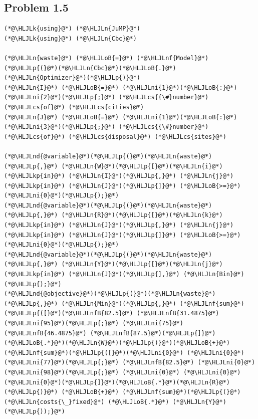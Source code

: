 \documentclass[12pt,a4paper]{article}
\newcommand{\HLJLk}[1]{\textcolor[RGB]{148,91,176}{\textbf{#1}}}
\newcommand{\HLJLkp}[1]{\textcolor[RGB]{148,91,176}{\textbf{#1}}}
\newcommand{\HLJLn}[1]{#1}
\newcommand{\HLJLnd}[1]{\textcolor[RGB]{214,102,97}{#1}}
\newcommand{\HLJLnf}[1]{\textcolor[RGB]{66,102,213}{#1}}
\newcommand{\HLJLnfB}[1]{\textcolor[RGB]{59,151,46}{#1}}
\newcommand{\HLJLni}[1]{\textcolor[RGB]{59,151,46}{#1}}
\newcommand{\HLJLoB}[1]{\textcolor[RGB]{102,102,102}{\textbf{#1}}}
\newcommand{\HLJLp}[1]{#1}
\newcommand{\HLJLcs}[1]{\textcolor[RGB]{153,153,119}{\textit{#1}}}
\begin{document}
\subsection{Problem 1.5}

\begin{lstlisting}
(*@\HLJLk{using}@*) (*@\HLJLn{JuMP}@*)
(*@\HLJLk{using}@*) (*@\HLJLn{Cbc}@*)

(*@\HLJLn{waste}@*) (*@\HLJLoB{=}@*) (*@\HLJLnf{Model}@*)(*@\HLJLp{(}@*)(*@\HLJLn{Cbc}@*)(*@\HLJLoB{.}@*)(*@\HLJLn{Optimizer}@*)(*@\HLJLp{)}@*)
(*@\HLJLn{I}@*) (*@\HLJLoB{=}@*) (*@\HLJLni{1}@*)(*@\HLJLoB{:}@*)(*@\HLJLni{2}@*)(*@\HLJLp{;}@*) (*@\HLJLcs{{\#}number}@*) (*@\HLJLcs{of}@*) (*@\HLJLcs{cities}@*)
(*@\HLJLn{J}@*) (*@\HLJLoB{=}@*) (*@\HLJLni{1}@*)(*@\HLJLoB{:}@*)(*@\HLJLni{3}@*)(*@\HLJLp{;}@*) (*@\HLJLcs{{\#}number}@*) (*@\HLJLcs{of}@*) (*@\HLJLcs{disposal}@*) (*@\HLJLcs{sites}@*)

(*@\HLJLnd{@variable}@*)(*@\HLJLp{(}@*)(*@\HLJLn{waste}@*)(*@\HLJLp{,}@*) (*@\HLJLn{W}@*)(*@\HLJLp{[}@*)(*@\HLJLn{i}@*) (*@\HLJLkp{in}@*) (*@\HLJLn{I}@*)(*@\HLJLp{,}@*) (*@\HLJLn{j}@*) (*@\HLJLkp{in}@*) (*@\HLJLn{J}@*)(*@\HLJLp{]}@*) (*@\HLJLoB{>=}@*) (*@\HLJLni{0}@*)(*@\HLJLp{);}@*)
(*@\HLJLnd{@variable}@*)(*@\HLJLp{(}@*)(*@\HLJLn{waste}@*)(*@\HLJLp{,}@*) (*@\HLJLn{R}@*)(*@\HLJLp{[}@*)(*@\HLJLn{k}@*) (*@\HLJLkp{in}@*) (*@\HLJLn{J}@*)(*@\HLJLp{,}@*) (*@\HLJLn{j}@*) (*@\HLJLkp{in}@*) (*@\HLJLn{J}@*)(*@\HLJLp{]}@*) (*@\HLJLoB{>=}@*) (*@\HLJLni{0}@*)(*@\HLJLp{);}@*)
(*@\HLJLnd{@variable}@*)(*@\HLJLp{(}@*)(*@\HLJLn{waste}@*)(*@\HLJLp{,}@*) (*@\HLJLn{Y}@*)(*@\HLJLp{[}@*)(*@\HLJLn{j}@*) (*@\HLJLkp{in}@*) (*@\HLJLn{J}@*)(*@\HLJLp{],}@*) (*@\HLJLn{Bin}@*)(*@\HLJLp{);}@*)
(*@\HLJLnd{@objective}@*)(*@\HLJLp{(}@*)(*@\HLJLn{waste}@*)(*@\HLJLp{,}@*) (*@\HLJLn{Min}@*)(*@\HLJLp{,}@*) (*@\HLJLnf{sum}@*)(*@\HLJLp{([}@*)(*@\HLJLnfB{82.5}@*) (*@\HLJLnfB{31.4875}@*) (*@\HLJLni{95}@*)(*@\HLJLp{;}@*) (*@\HLJLni{75}@*) (*@\HLJLnfB{46.4875}@*) (*@\HLJLnfB{87.5}@*)(*@\HLJLp{]}@*)(*@\HLJLoB{.*}@*)(*@\HLJLn{W}@*)(*@\HLJLp{)}@*)(*@\HLJLoB{+}@*)(*@\HLJLnf{sum}@*)(*@\HLJLp{([}@*)(*@\HLJLni{0}@*) (*@\HLJLni{0}@*) (*@\HLJLni{77}@*)(*@\HLJLp{;}@*) (*@\HLJLnfB{82.5}@*) (*@\HLJLni{0}@*) (*@\HLJLni{98}@*)(*@\HLJLp{;}@*) (*@\HLJLni{0}@*) (*@\HLJLni{0}@*) (*@\HLJLni{0}@*)(*@\HLJLp{]}@*)(*@\HLJLoB{.*}@*)(*@\HLJLn{R}@*)(*@\HLJLp{)}@*) (*@\HLJLoB{+}@*) (*@\HLJLnf{sum}@*)(*@\HLJLp{(}@*)(*@\HLJLn{costs{\_}fixed}@*) (*@\HLJLoB{.*}@*) (*@\HLJLn{Y}@*)(*@\HLJLp{));}@*)


\end{lstlisting}
\end{document}
